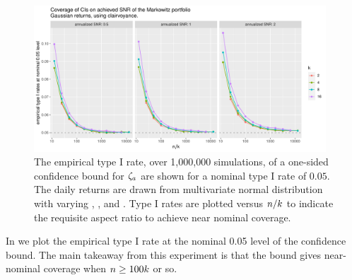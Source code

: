 \documentclass[10pt,a4paper,english]{article}
\theoremstyle{plain}
\theoremstyle{definition}
\theoremstyle{remark}
\begin{document}
\begin{knitrout}\small
{}\color{fgcolor}\begin{figure}[h]
\includegraphics[width=0.975\textwidth,height=0.4875\textwidth]{figure/snrinfbadci_ci_plots-1} \caption[The empirical type I rate, over 1,000,000 simulations, of a one-sided confidence bound for $\psnr_{a}$ are shown for a nominal type I rate of $0.05$]{The empirical type I rate, over 1,000,000 simulations, of a one-sided confidence bound for $\psnr_{a}$ are shown for a nominal type I rate of $0.05$. The daily returns are drawn from multivariate normal distribution with varying \psnropt, \ssiz, and \nstrat. Type I rates are plotted versus $\ssiz/\nstrat$ to indicate the requisite aspect ratio to achieve near nominal coverage. }\label{fig:badci_ci_plots}
\end{figure}


\end{knitrout}
In  we plot the empirical type I rate at the nominal
0.05 level of the confidence bound. 
The main takeaway from this experiment is that the bound gives near-nominal
coverage when $\ssiz \ge 100\nstrat$ or so.
\end{document}

